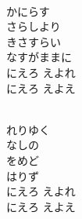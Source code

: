 \documentclass[10pt,b5j]{tarticle} %
\begin{document}
\vspace{1.5em} %
\newcommand{\linespace}{0.5em} %
\newcommand{\blocksize}{0.5\hsize} %
\newcommand{\itemmargin}{3em} %
\begin{enumerate} %
    \setlength{\itemindent}{\itemmargin} %
    \begin{minipage}[c]{\blocksize}
    
        \vspace{\linespace}
        \item~\\
        かにらす\\
        さらしより\\
        きさすらい\\
        なすがままに\\
        にえろ
        えよれ\\
        にえろ
        えよえ
        
        \vspace{\linespace}
        \item~\\
        れりゆく\\
        なしの\\
        をめど\\
        はりず\\
        にえろ
        えよれ\\
        にえろ
        えよえ
        
    \end{minipage}
    \begin{minipage}[c]{\blocksize}
        

\end{minipage}
\end{enumerate}
\end{document}
